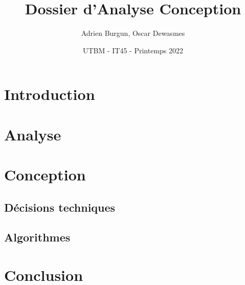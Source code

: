 \documentclass[11pt]{article}
\title{\textbf{Dossier d'Analyse Conception}}
\author{Adrien Burgun, Oscar Dewasmes}
\date{UTBM - IT45 - Printemps 2022} %
\begin{document}
\maketitle


\newpage
\tableofcontents


\newpage
\section{Introduction}


\newpage
\section{Analyse}




\newpage
\section{Conception}
\subsection{Décisions techniques}

\subsection{Algorithmes}










\newpage
\section{Conclusion}
\end{document}
